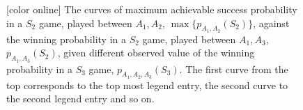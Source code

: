 \documentclass[%
 reprint,
 amsmath,amssymb,
 aps,
]{revtex4-1}
\theoremstyle{plain}
\begin{document}
\begin{figure}
 \hfill
{}
\caption{[color online] The curves of maximum achievable success probability in a $S_2$ game, played between $A_1,A_2$, $\max\{p_{A_1,A_2}(S_2)\}$, against the winning probability in a $S_2$ game, played between $A_1,A_3$, $p_{A_1,A_3}(S_2)$, given different observed value of the winning probability in a $S_3$ game, $p_{A_1,A_2,A_3}(S_3)$. The first curve from the top corresponds to the top most legend entry, the second curve to the second legend entry and so on.}
\label{ahCommon}
\end{figure}
\end{document}
